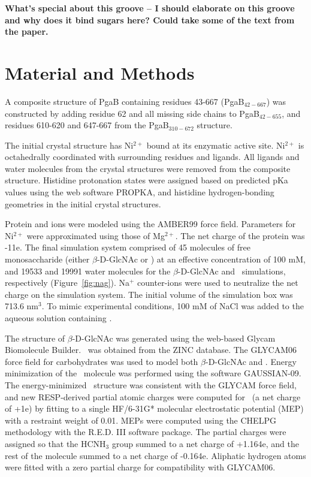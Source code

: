 \textbf{What's special about this groove -- I should elaborate on this groove and why does it bind sugars here? Could take some of the text from the paper.} 


\section{Material and Methods}

A composite structure of PgaB containing residues 43-667 (PgaB$_{42-667}$) was constructed by adding residue 62 and all missing side chains to PgaB$_{42-655}$, and residues 610-620 and 647-667 from the PgaB$_{310-672}$ structure.

The initial crystal structure has Ni$^{2+}$ bound at its enzymatic active site. Ni$^{2+}$ is octahedrally coordinated with surrounding residues and ligands. All ligands and water molecules from the crystal structures were removed from the composite structure. Histidine protonation states were assigned based on predicted pKa values using the web software PROPKA,\cite{Bas:2008ul,Olsson:2011vi,Sondergaard:2011ug} and histidine hydrogen-bonding geometries in the initial crystal structures.

Protein and ions were modeled using the AMBER99 force field.\cite{Cornell:1995td} Parameters for Ni$^{2+}$ were approximated using those of Mg$^{2+}$. The net charge of the protein was -11e. The final simulation system comprised of 45 molecules of free monosaccharide (either $\beta$-D-GlcNAc or \glucosamine) at an effective concentration of 100 mM, and 19533 and 19991 water molecules for the $\beta$-D-GlcNAc and \glucosamine\ simulations, respectively (Figure~\ref{fig:nag}). Na$^{+}$ counter-ions were used to neutralize the net charge on the simulation system. The initial volume of the simulation box was 713.6 nm$^{3}$. To mimic experimental conditions, 100 mM of NaCl was added to the aqueous solution containing \glucosamine. 

The structure of $\beta$-D-GlcNAc was generated using the web-based Glycam Biomolecule Builder\cite{Woods:glycambuilder}. \glucosamine\ was obtained from the ZINC database.\cite{Irwin:2005kx} The GLYCAM06 force field for carbohydrates\cite{Kirschner:2008ii} was used to model both $\beta$-D-GlcNAc and \glucosamine. Energy minimization of the \glucosamine\ molecule was performed using the software GAUSSIAN-09.\cite{g09} The energy-minimized \glucosamine\ structure was consistent with the GLYCAM force field, and new RESP-derived partial atomic charges were computed for \glucosamine\ (a net charge of +1e) by fitting to a single HF/6-31G* molecular electrostatic potential (MEP) with a restraint weight of 0.01. MEPs were computed using the CHELPG methodology\cite{Breneman:1990ue} with the R.E.D. III software package.\cite{Dupradeau:2010bb} The partial charges were assigned so that the HCNH$_{3}$ group summed to a net charge of +1.164e, and the rest of the molecule summed to a net charge of -0.164e. Aliphatic hydrogen atoms were fitted with a zero partial charge for compatibility with GLYCAM06.

